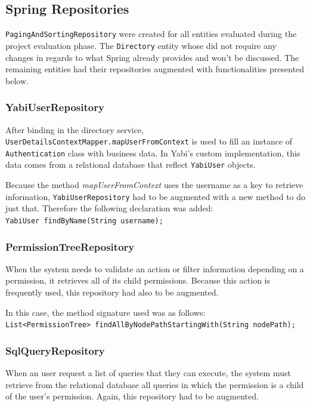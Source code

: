 \subsection{Spring Repositories}\label{impl:repos}
\texttt{PagingAndSortingRepository} were created for all entities evaluated during the project evaluation phase.
The \texttt{Directory} entity whose did not require any changes in regards to what Spring already provides and won't be discussed.
The remaining entities had their repositories augmented with functionalities presented below.

\subsubsection{YabiUserRepository}
After binding in the directory service, \texttt{UserDetailsContextMapper.mapUserFromContext} is used to fill an instance of \texttt{Authentication} class with business data. In \gls{Yabi}'s custom implementation, this data comes from a relational database that reflect \texttt{YabiUser} objects.

Because the method \textit{mapUserFromContext} uses the username as a key to retrieve information, \texttt{YabiUserRepository} had to be augmented with a new method to do just that. Therefore the following declaration was added:\\
\texttt{YabiUser findByName(String username);}

\subsubsection{PermissionTreeRepository}
When the system needs to validate an action or filter information depending on a permission, it retrieves all of its child permissions. Because this action is frequently used, this repository had also to be augmented.

In this case, the method signature used was as follows:\\
\texttt{List<PermissionTree> findAllByNodePathStartingWith(String~nodePath);}

\subsubsection{SqlQueryRepository}
When an user request a list of queries that they can execute, the system must retrieve from the relational database all queries in which the permission is a child of the user's permission. Again, this repository had to be augmented.

